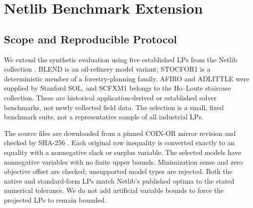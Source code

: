 \documentclass[12pt,letterpaper,oneside]{report}
\theoremstyle{definition}
\begin{document}
\chapter{Netlib Benchmark Extension}
\section{Scope and Reproducible Protocol}
We extend the synthetic evaluation using five established LPs from the
Netlib collection \cite{netlib}. BLEND is an oil-refinery model variant;
STOCFOR1 is a deterministic member of a forestry-planning family. AFIRO
and ADLITTLE were supplied by Stanford SOL, and SCFXM1 belongs to the
Ho--Loute staircase collection. These are historical application-derived
or established solver benchmarks, not newly collected field data.
The selection is a small, fixed benchmark suite, not a representative
sample of all industrial LPs.

The source files are downloaded from a pinned COIN-OR mirror revision
and checked by SHA-256 \cite{netlibmirror}. Each original row inequality
is converted exactly to an equality with a nonnegative slack or surplus
variable. The selected models have nonnegative variables with no finite
upper bounds. Minimization sense and zero objective offset are checked;
unsupported model types are rejected. Both the native and standard-form
LPs match Netlib's published optima to the stated numerical tolerance.
We do not add artificial variable bounds to force the projected LPs to
remain bounded.

\par\medskip
\noindent\begin{minipage}{\linewidth}
\small\linespread{1}\selectfont\centering
\setlength{\tabcolsep}{4pt}
\renewcommand{\arraystretch}{1.08}
\label{tab:netlib-datasets}
\medskip
{}%
\ifdim\wd0>\linewidth
  \resizebox{\linewidth}{!}{\usebox0}
\else
  \usebox0
\fi
\end{minipage}
\par\medskip
\end{document}
